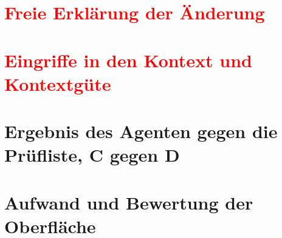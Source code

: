 \section[Freie Erklärung der Änderung]{\textcolor{red}{Freie Erklärung der Änderung}}%
\label{sec:erklaerungen}

\section[Eingriffe in den Kontext und Kontextgüte]{\textcolor{red}{Eingriffe in den Kontext und Kontextgüte}}%
\label{sec:eingriffe}

\section{Ergebnis des Agenten gegen die Prüfliste, C gegen D}%
\label{sec:agentenergebnis}

\section{Aufwand und Bewertung der Oberfläche}%
\label{sec:erg-aufwand}
